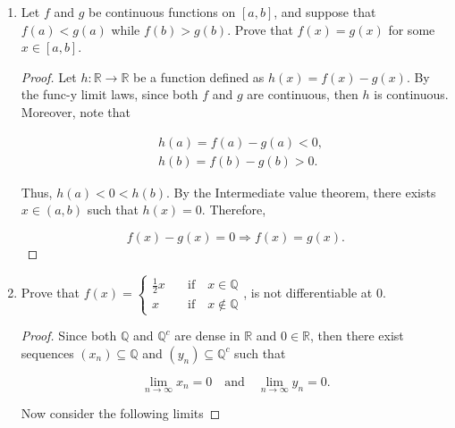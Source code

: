 \documentclass{article}
\theoremstyle{definition}
\theoremstyle{remark}
\theoremstyle{definition}
\begin{document}
\begin{enumerate}[leftmargin=*]
\begin{proof}
        \end{proof}
    
        
        
    \item Let $f$ and $g$ be continuous functions on $[a,b]$, and suppose that $f(a)<g(a)$ while $f(b)>g(b)$. Prove that $f(x)=g(x)$ for some $x\in[a,b]$.
    
    \begin{proof}
        Let $h\colon\mathbb{R}\rightarrow\mathbb{R}$ be a function defined as $h(x)=f(x)-g(x)$. By the func-y limit laws, since both $f$ and $g$ are continuous, then $h$ is continuous. Moreover, note that 
        
        \begin{equation*}
            \begin{split}
                &h(a)=f(a)-g(a)<0,\\
                &h(b)=f(b)-g(b)>0.
            \end{split}
        \end{equation*}
        
        \noindent Thus, $h(a)<0<h(b)$. By the Intermediate value theorem, there exists $x\in(a,b)$ such that $h(x)=0$. Therefore, 
        
        \begin{equation*}
            f(x)-g(x)=0\Rightarrow f(x)=g(x).
        \end{equation*}
    \end{proof}
    
    \item Prove that $f(x)=\begin{cases} \frac{1}{2}x &\quad\text{if}\quad x\in\mathbb{Q} \\ x &\quad\text{if}\quad x\notin\mathbb{Q} \end{cases}$, is not differentiable at 0.
    
    \begin{proof}
        Since both $\mathbb{Q}$ and $\mathbb{Q}^c$ are dense in $\mathbb{R}$ and $0\in\mathbb{R}$, then there exist sequences $(x_n)\subseteq\mathbb{Q}$ and $(y_n)\subseteq\mathbb{Q}^c$ such that 
        
        \begin{equation*}
            \lim_{n\rightarrow\infty}x_n=0\quad\text{and}\quad\lim_{n\rightarrow\infty}y_n=0.
        \end{equation*}
        
        \noindent Now consider the following limits
        

\end{proof}
\end{enumerate}
\end{document}

